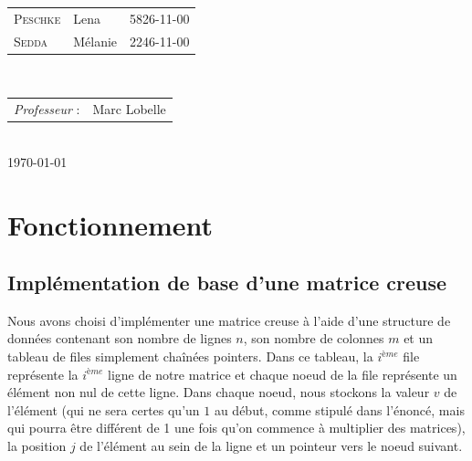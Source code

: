 \documentclass[12pt,a4paper]{article}
\begin{document}
\begin{titlepage}
\large 
{\begin{tabular}{lll}
\textsc{Peschke} & Lena & 5826-11-00\\
\textsc{Sedda} & Mélanie & 2246-11-00\\
\end{tabular}}
\\[1cm]

\normalsize
{\begin{tabular}{ll}
\textit{Professeur} : & Marc Lobelle \\
\end{tabular}}
\\[1cm]


{\normalsize \today}\\[3cm] %

\newpage

\end{titlepage}


\clearpage
\thispagestyle{empty}
\tableofcontents
\clearpage
{}


\section{Fonctionnement}


\subsection{Implémentation de base d'une matrice creuse}
Nous avons choisi d'implémenter une matrice creuse à l'aide d'une structure de données contenant son nombre de lignes $n$, son nombre de colonnes $m$ et un tableau de files simplement chaînées pointers. Dans ce tableau, la $i^{ème}$ file représente la  $i^{ème}$ ligne de notre matrice et chaque noeud de la file représente un élément non nul de cette ligne. Dans chaque noeud, nous stockons la valeur $v$ de l'élément (qui ne sera certes qu'un $1$ au début, comme stipulé dans l'énoncé, mais qui pourra être différent de 1 une fois qu'on commence à multiplier des matrices), la position $j$ de l'élément au sein de la ligne et un pointeur vers le noeud suivant.\\
\end{document}
